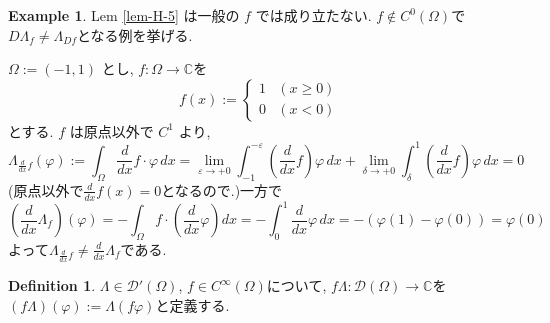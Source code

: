 \documentclass[dvipdfmx,a4paper,11pt]{article} %
\theoremstyle{definition}
\newtheorem{defn}[thm]{Definition}
\newtheorem{ex}[thm]{Example}
\theoremstyle{remark}
\numberwithin{equation}{section}
\begin{document}
\begin{ex}{\cite[6.11]{Rud}}
\label{ex-H-6}
Lem \ref{lem-H-5} は一般の \(f\) では成り立たない. 
$f \not \in C^0(\Omega)$で$D \Lambda_f \neq \Lambda_{D f}$となる例を挙げる. 

\(\Omega := (-1,1)\) とし, \(f : \Omega \to \mathbb{C}\)を
\[
 f(x) := \begin{cases} 1 & (x \ge 0) \\ 0 & (x < 0) \end{cases}
 \]
とする.
 \(f\) は原点以外で \(C^1\) より, 
\[
\Lambda_{\frac{d}{dx} f}(\varphi) := 
\int_\Omega \frac{d}{dx} f \cdot \varphi \, dx
= \lim_{\varepsilon \to +0} \int_{-1}^{-\varepsilon} \left( \frac{d}{dx} f \right) \varphi \, dx 
+ \lim_{\delta \to +0} \int_{\delta}^1 \left( \frac{d}{dx} f \right) \varphi \, dx
= 0 
\]
(原点以外で$\frac{d}{dx} f(x) = 0$となるので.)一方で
\[
\left( \frac{d}{dx} \Lambda_f \right)(\varphi) = - \int_\Omega f \cdot \left( \frac{d}{dx} \varphi \right) dx = - \int_0^1 \frac{d}{dx} \varphi \, dx
= - (\varphi(1) - \varphi(0)) = \varphi(0)
\]
よって\(\Lambda_{\frac{d}{dx} f} \neq \frac{d}{dx} \Lambda_f \)である. 
\end{ex}

\begin{tcolorbox}[mybox]
\begin{defn}{\cite[6.15]{Rud}}
\label{defn-H-7}
\(\Lambda \in \mathcal{D}'(\Omega)\), \(f \in C^\infty(\Omega)\)について, 
\(f \Lambda : \mathcal{D}(\Omega) \to \mathbb{C}\)を
\((f \Lambda)(\varphi) := \Lambda(f \varphi)\)と定義する.
\end{defn}
\end{tcolorbox}
\end{document}
